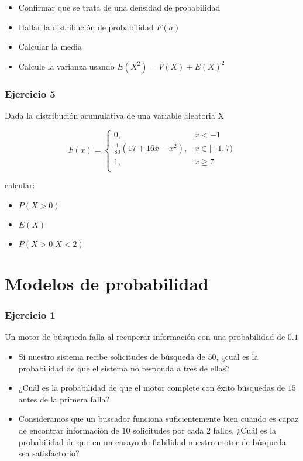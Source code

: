\documentclass[
]{book}
\providecommand{\tightlist}{%
  \setlength{\itemsep}{0pt}\setlength{\parskip}{0pt}}
\begin{document}
\begin{itemize}
\tightlist
\item
  Confirmar que se trata de una densidad de probabilidad
\item
  Hallar la distribución de probabilidad \(F(a)\)
\item
  Calcular la media
\item
  Calcule la varianza usando \(E(X^2)=V(X)+E(X)^2\)
\end{itemize}

\hypertarget{ejercicio-5-1}{%
\subsubsection{Ejercicio 5}\label{ejercicio-5-1}}

Dada la distribución acumulativa de una variable aleatoria X

\[
    F(x)= 
\begin{cases}
0, & x  < -1 \\
\frac{1}{80}(17+16x-x^2),& x \in [-1,7)\\
1,& x \geq 7\\
\end{cases}
\]

calcular:

\begin{itemize}
\tightlist
\item
  \(P(X>0)\)
\item
  \(E(X)\)
\item
  \(P(X>0|X<2)\)
\end{itemize}

\hypertarget{modelos-de-probabilidad}{%
\section{Modelos de probabilidad}\label{modelos-de-probabilidad}}

\hypertarget{ejercicio-1-4}{%
\subsubsection{Ejercicio 1}\label{ejercicio-1-4}}

Un motor de búsqueda falla al recuperar información con una probabilidad de \(0.1\)

\begin{itemize}
\item
  Si nuestro sistema recibe solicitudes de búsqueda de \(50\), ¿cuál es la probabilidad de que el sistema no responda a tres de ellas?
\item
  ¿Cuál es la probabilidad de que el motor complete con éxito búsquedas de \(15\) antes de la primera falla?
\item
  Consideramos que un buscador funciona suficientemente bien cuando es capaz de encontrar información de \(10\) solicitudes por cada \(2\) fallos. ¿Cuál es la probabilidad de que en un ensayo de fiabilidad nuestro motor de búsqueda sea satisfactorio?
\end{itemize}
\end{document}
